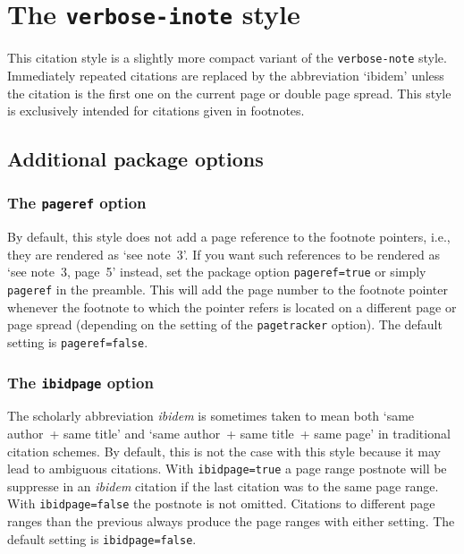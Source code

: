 \documentclass[a4paper]{article}
\begin{document}
\section*{The \texttt{verbose-inote} style}

This citation style is a slightly more compact variant of the
\texttt{verbose-note} style. Immediately repeated citations are
replaced by the abbreviation `ibidem' unless the citation is the
first one on the current page or double page spread. This style is
exclusively intended for citations given in footnotes.

\subsection*{Additional package options}

\subsubsection*{The \texttt{pageref} option}

By default, this style does not add a page reference to the footnote
pointers, i.e., they are rendered as `see note~3'. If you want such
references to be rendered as `see note~3, page~5' instead, set the
package option \texttt{pageref=true} or simply \texttt{pageref} in
the preamble. This will add the page number to the footnote pointer
whenever the footnote to which the pointer refers is located on a
different page or page spread (depending on the setting of the
\texttt{pagetracker} option). The default setting is
\texttt{pageref=false}.

\subsubsection*{The \texttt{ibidpage} option}

The scholarly abbreviation \emph{ibidem} is sometimes taken to mean
both `same author~+ same title' and `same author~+ same title~+ same
page' in traditional citation schemes. By default, this is not the
case with this style because it may lead to ambiguous citations.
With \texttt{ibidpage=true} a page range postnote will be suppresse
in an \emph{ibidem} citation if the last citation was to the same
page range. With \texttt{ibidpage=false} the postnote is not omitted.
Citations to different page ranges than the previous always produce
the page ranges with either setting.
The default setting is \texttt{ibidpage=false}.
\end{document}
